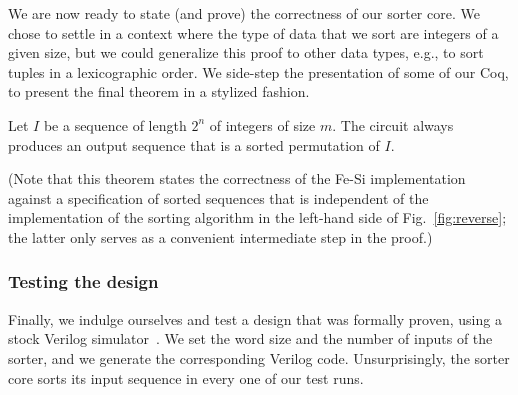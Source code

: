 \documentclass{llncs}
\begin{document}
We are now ready to state (and prove) the correctness of our sorter
core. We chose to settle in a context where the type of data that we
sort are integers of a given size, but we could generalize this proof
to other data types, e.g., to sort tuples in a lexicographic order.
We side-step the presentation of some of our Coq, to present the final
theorem in a stylized fashion.
\begin{theorem}
Let $I$ be a sequence of length $2^n$ of integers of size $m$. The
circuit always produces an output sequence that is a sorted permutation of $I$.
\end{theorem}
(Note that this theorem states the correctness of the Fe-Si
implementation against a specification of sorted sequences that is
independent of the implementation of the sorting algorithm in the
left-hand side of Fig.~\ref{fig:reverse}; the latter only serves as a
convenient intermediate step in the proof.)



\subsubsection{Testing the design}
Finally, we indulge ourselves and test a design that was formally
proven, using a stock Verilog simulator~\cite{iverilog}. We set the
word size and the number of inputs of the sorter, and we generate the
corresponding Verilog code. Unsurprisingly, the sorter core sorts its
input sequence in every one of our test runs.
\end{document}
